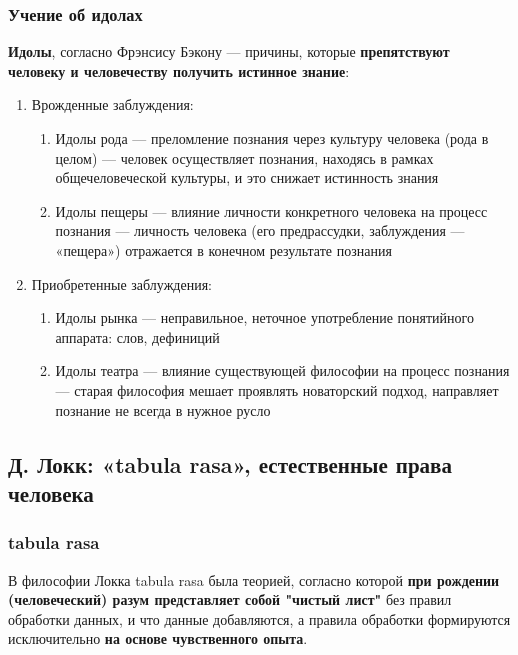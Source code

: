 \documentclass{article}
\begin{document}
\begin{flushleft}
\subsubsection{Учение об идолах}

\textbf{Идолы}, согласно Фрэнсису Бэкону — причины, которые \textbf{препятствуют человеку и человечеству получить истинное знание}:

\begin{enumerate}
    \item Врожденные заблуждения:
    \begin{enumerate}
        \item Идолы рода — преломление познания через культуру человека (рода в целом) — человек осуществляет познания, находясь в рамках общечеловеческой культуры, и это снижает истинность знания
        \item Идолы пещеры — влияние личности конкретного человека на процесс познания — личность человека (его предрассудки, заблуждения — «пещера») отражается в конечном результате познания
    \end{enumerate}
    \item Приобретенные заблуждения:
    \begin{enumerate}
        \item Идолы рынка — неправильное, неточное употребление понятийного аппарата: слов, дефиниций
        \item Идолы театра — влияние существующей философии на процесс познания — старая философия мешает проявлять новаторский подход, направляет познание не всегда в нужное русло
    \end{enumerate}
\end{enumerate}

\subsection{Д. Локк: «tabula rasa», естественные права человека}

\subsubsection{tabula rasa}

В философии Локка tabula rasa была теорией, согласно которой \textbf{при рождении (человеческий) разум представляет собой "чистый лист"} без правил обработки данных, и что данные добавляются, а правила обработки формируются исключительно \textbf{на основе чувственного опыта}.


\end{flushleft}
\end{document}
